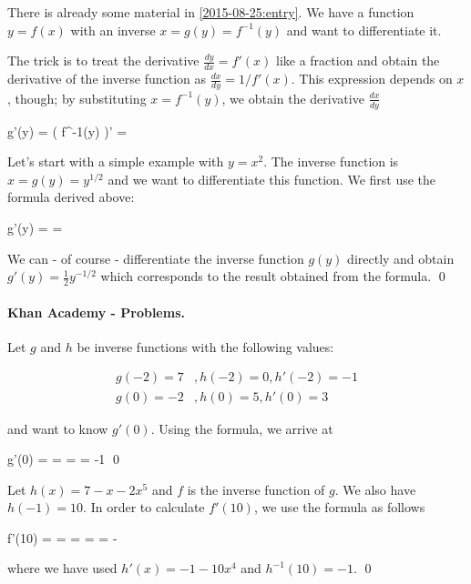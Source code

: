 
There is already some material in \ref{2015-08-25:entry}. We have a function $y = f(x)$ with an inverse $x = g(y) = f^{-1}(y)$ and want to differentiate it.

The trick is to treat the derivative $\frac{dy}{dx} = f'(x)$ like a fraction and obtain the derivative of the inverse function  as $\frac{dx}{dy} = 1 / f'(x)$. This expression depends on $x$, though; by substituting $x=f^{-1}(y)$, we obtain the derivative $\frac{dx}{dy}$ 

\bee
g'(y) = \left( f^{-1}(y) \right)' = 
\eee

Let's start with a simple example with $y = x^2$. The inverse function is $x = g(y) = y^{1/2}$ and we want to differentiate this function. We first use the formula derived above:

\bee
g'(y) =  = 
\eee

We can - of course - differentiate the inverse function $g(y)$ directly and obtain $g'(y) = \frac{1}{2} y^{-1/2}$ which corresponds to the result obtained from the formula. \qed


\paragraph{Khan Academy - Problems.} Let $g$ and $h$ be inverse functions with the following values:

\begin{align*}
g(-2) = 7 &, h(-2) = 0, h'(-2) = -1 \\
g(0) = -2 &, h(0) = 5, h'(0) = 3
\end{align*}

and want to know $g'(0)$. Using the formula, we arrive at

\bee
g'(0) =  =  =  = -1 \qed
\eee

Let $h(x) = 7 - x - 2x^5$ and $f$ is the inverse function of $g$. We also have $h(-1) = 10$. In order to calculate $f'(10)$, we use the formula as follows

\bee
f'(10) =  =  =  =  = - 
\eee

where we have used $h'(x) = -1-10x^4$ and $h^{-1}(10) = -1$. \qed

